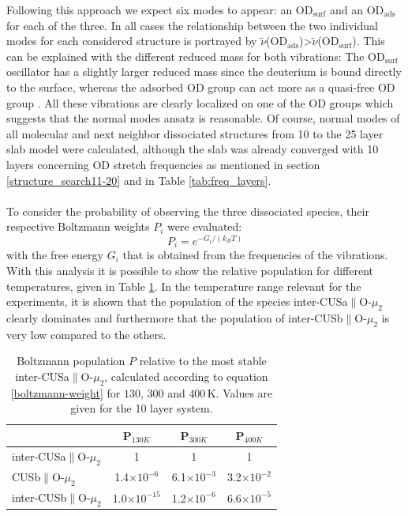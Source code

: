 \documentclass[11pt,DIV=13,BCOR=5mm,a4paper,headinclude]{scrbook}
\begin{document}
 Following this approach we expect six modes to appear: an OD$_\textrm{surf}$ and an OD$_\textrm{ads}$ for each of the three.
In all cases the relationship between the two individual modes for each considered structure is portrayed by $\tilde{\nu}$(OD$_\textrm{ads}$)>$\tilde{\nu}$(OD$_\textrm{surf}$).
This can be explained with the different reduced mass for both vibrations: The OD$_\textrm{surf}$ oscillator has a slightly larger reduced mass since the deuterium is bound directly to the surface, whereas the adsorbed OD group can act more as a quasi-free OD group \cite{Wirth2014}.
All these vibrations are clearly localized on one of the OD groups which suggests that the normal modes ansatz is reasonable.
Of course, normal modes of all molecular and next neighbor dissociated structures from 10 to the 25 layer slab model were calculated, although the slab was already converged with 10 layers concerning OD stretch frequencies as mentioned in section \ref{structure_search11-20} and in Table \ref{tab:freq_layers}. 
\\
\\

To consider the probability of observing the three dissociated species, their respective Boltzmann weights $P_i$ were evaluated:
\begin{equation}\label{boltzmann-weight}
 P_i=e^{-G_i/(k_BT)}
\end{equation}
with the free energy $G_i$ that is obtained from the frequencies of the vibrations.
With this analysis it is possible to show the relative population for different temperatures, given in Table \ref{tab:boltzmann-pop}.
In the temperature range relevant for the experiments, it is shown that the population of the species inter-CUSa$\parallel$O-$\mu_2$ clearly dominates and furthermore that the population of inter-CUSb$\parallel$O-$\mu_2$ is very low compared to the others.
\begin{table}[th]
  \centering
 \caption{Boltzmann population $P$ relative to the most stable inter-CUSa$\parallel$O-$\mu_2$, calculated according to equation \ref{boltzmann-weight} for $130$, $300$ and $400\,$K.
Values are given for the 10 layer system.}
\vspace*{.2cm} 
 \begin{tabular}{l|ccc}
 \toprule
  & P$_{130K}$ & P$_{300K}$ & P$_{400K}$\\\midrule
  inter-CUSa$\parallel$O-$\mu_2$ &1 &1 &1 \\
  CUSb$\parallel$O-$\mu_2$ & 1.4$\times 10^{-6}$& 6.1$\times 10^{-3}$& 3.2$\times 10^{-2}$\\
  inter-CUSb$\parallel$O-$\mu_2$ & 1.0$\times 10^{-15}$ & 1.2$\times 10^{-6}$ & 6.6$\times 10^{-5}$\\\bottomrule
  \end{tabular} 
  \label{tab:boltzmann-pop}
\end{table}
\end{document}

